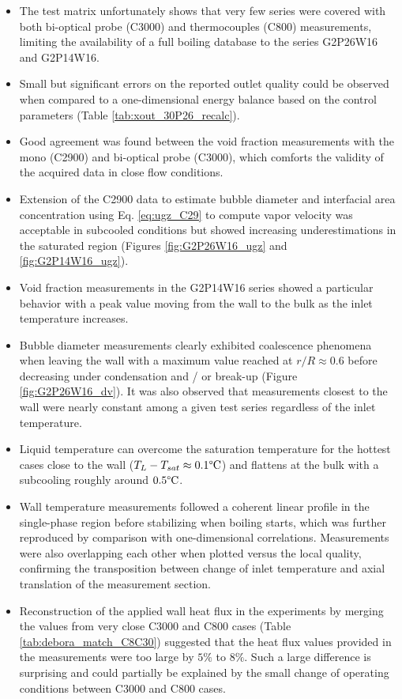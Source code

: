 \begin{itemize}
\item The test matrix unfortunately shows that very few series were covered with both bi-optical probe (C3000) and thermocouples (C800) measurements, limiting the availability of a full boiling database to the series G2P26W16 and G2P14W16.

\item Small but significant errors on the reported outlet quality could be observed when compared to a one-dimensional energy balance based on the control parameters (Table \ref{tab:xout_30P26_recalc}).

\item Good agreement was found between the void fraction measurements with the mono (C2900) and bi-optical probe (C3000), which comforts the validity of the acquired data in close flow conditions.

\item Extension of the C2900 data to estimate bubble diameter and interfacial area concentration using Eq. \ref{eq:ugz_C29} to compute vapor velocity was acceptable in subcooled conditions but showed increasing underestimations in the saturated region (Figures \ref{fig:G2P26W16_ugz} and \ref{fig:G2P14W16_ugz}).

\item Void fraction measurements in the G2P14W16 series showed a particular behavior with a peak value moving from the wall to the bulk as the inlet temperature increases.

\item Bubble diameter measurements clearly exhibited coalescence phenomena when leaving the wall with a maximum value reached at $r/R \approx 0.6$ before decreasing under condensation and / or break-up (Figure \ref{fig:G2P26W16_dv}). It was also observed that measurements closest to the wall were nearly constant among a given test series regardless of the inlet temperature.

\item Liquid temperature can overcome the saturation temperature for the hottest cases close to the wall ($T_{L}-T_{sat}\approx 0.1\degree\mathrm{C}$) and flattens at the bulk with a subcooling roughly around $0.5\degree\mathrm{C}$.

\item Wall temperature measurements followed a coherent linear profile in the single-phase region before stabilizing when boiling starts, which was further reproduced by comparison with one-dimensional correlations. Measurements were also overlapping each other when plotted versus the local quality, confirming the transposition between change of inlet temperature and axial translation of the measurement section.

\item Reconstruction of the applied wall heat flux in the experiments by merging the values from very close C3000 and C800 cases (Table \ref{tab:debora_match_C8C30}) suggested that the heat flux values provided in the measurements were too large by $5\%$ to $8\%$. Such a large difference is surprising and could partially be explained by the small change of operating conditions between C3000 and C800 cases.
\end{itemize}


